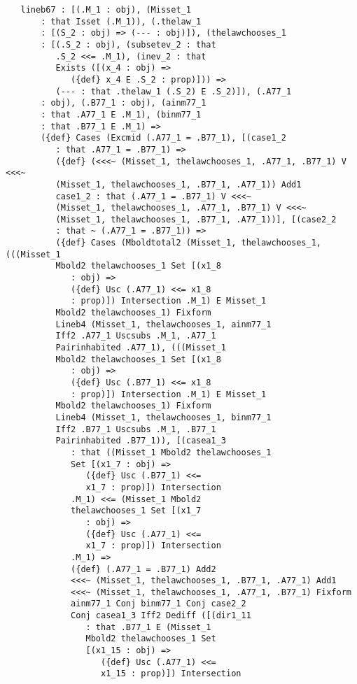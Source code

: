 \documentclass[12pt]{article}
\begin{document}
\begin{verbatim}
   lineb67 : [(.M_1 : obj), (Misset_1 
       : that Isset (.M_1)), (.thelaw_1 
       : [(S_2 : obj) => (--- : obj)]), (thelawchooses_1 
       : [(.S_2 : obj), (subsetev_2 : that 
          .S_2 <<= .M_1), (inev_2 : that 
          Exists ([(x_4 : obj) => 
             ({def} x_4 E .S_2 : prop)])) => 
          (--- : that .thelaw_1 (.S_2) E .S_2)]), (.A77_1 
       : obj), (.B77_1 : obj), (ainm77_1 
       : that .A77_1 E .M_1), (binm77_1 
       : that .B77_1 E .M_1) => 
       ({def} Cases (Excmid (.A77_1 = .B77_1), [(case1_2 
          : that .A77_1 = .B77_1) => 
          ({def} (<<<~ (Misset_1, thelawchooses_1, .A77_1, .B77_1) V <<<~ 
          (Misset_1, thelawchooses_1, .B77_1, .A77_1)) Add1 
          case1_2 : that (.A77_1 = .B77_1) V <<<~ 
          (Misset_1, thelawchooses_1, .A77_1, .B77_1) V <<<~ 
          (Misset_1, thelawchooses_1, .B77_1, .A77_1))], [(case2_2 
          : that ~ (.A77_1 = .B77_1)) => 
          ({def} Cases (Mboldtotal2 (Misset_1, thelawchooses_1, (((Misset_1 
          Mbold2 thelawchooses_1 Set [(x1_8 
             : obj) => 
             ({def} Usc (.A77_1) <<= x1_8 
             : prop)]) Intersection .M_1) E Misset_1 
          Mbold2 thelawchooses_1) Fixform 
          Lineb4 (Misset_1, thelawchooses_1, ainm77_1 
          Iff2 .A77_1 Uscsubs .M_1, .A77_1 
          Pairinhabited .A77_1), (((Misset_1 
          Mbold2 thelawchooses_1 Set [(x1_8 
             : obj) => 
             ({def} Usc (.B77_1) <<= x1_8 
             : prop)]) Intersection .M_1) E Misset_1 
          Mbold2 thelawchooses_1) Fixform 
          Lineb4 (Misset_1, thelawchooses_1, binm77_1 
          Iff2 .B77_1 Uscsubs .M_1, .B77_1 
          Pairinhabited .B77_1)), [(casea1_3 
             : that ((Misset_1 Mbold2 thelawchooses_1 
             Set [(x1_7 : obj) => 
                ({def} Usc (.B77_1) <<= 
                x1_7 : prop)]) Intersection 
             .M_1) <<= (Misset_1 Mbold2 
             thelawchooses_1 Set [(x1_7 
                : obj) => 
                ({def} Usc (.A77_1) <<= 
                x1_7 : prop)]) Intersection 
             .M_1) => 
             ({def} (.A77_1 = .B77_1) Add2 
             <<<~ (Misset_1, thelawchooses_1, .B77_1, .A77_1) Add1 
             <<<~ (Misset_1, thelawchooses_1, .A77_1, .B77_1) Fixform 
             ainm77_1 Conj binm77_1 Conj case2_2 
             Conj casea1_3 Iff2 Dediff ([(dir1_11 
                : that .B77_1 E (Misset_1 
                Mbold2 thelawchooses_1 Set 
                [(x1_15 : obj) => 
                   ({def} Usc (.A77_1) <<= 
                   x1_15 : prop)]) Intersection 

\end{verbatim}
\end{document}
